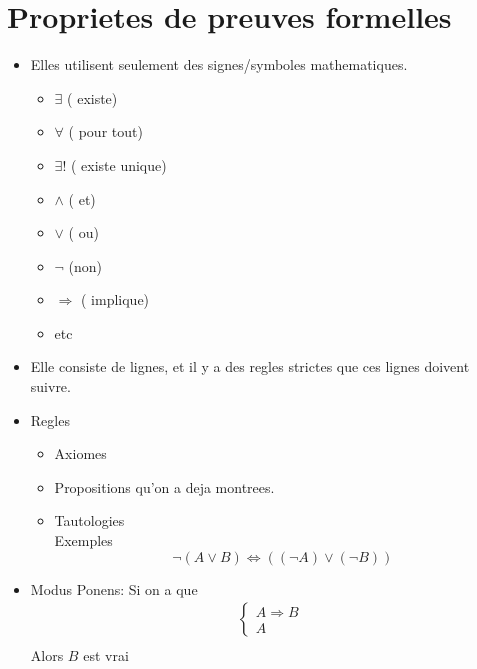 \documentclass[../main.tex]{subfiles}
\begin{document}
\section{Proprietes de preuves formelles}
\begin{itemize}
	\item Elles utilisent seulement des signes/symboles mathematiques.
		\begin{itemize}
			\item $\exists$ ( existe)\\
			\item $\forall$ ( pour tout)\\
			\item $\exists !$ ( existe unique)\\
			\item  $\land$  ( et) \\
			\item $\lor$ ( ou) \\
			\item $\neg$ (non) \\
			\item  $\Rightarrow$ ( implique)\\
			\item etc
		\end{itemize}
	\item Elle consiste de lignes, et il y a des regles strictes que ces lignes doivent suivre.\\
	\item Regles
		\begin{itemize}
			\item Axiomes\\
			\item Propositions qu'on a deja montrees.\\
			\item Tautologies\\
				Exemples
				\[ 
					\neg ( A \lor B) \iff ( ( \neg A) \lor ( \neg B))
				\]
		\end{itemize}
	\item Modus Ponens: Si on a que 
		\begin{align*}
		\begin{cases}
		A \Rightarrow B\\
		A
		\end{cases}\\
		\end{align*}
		Alors $B$ est vrai
\end{itemize}
\end{document}
